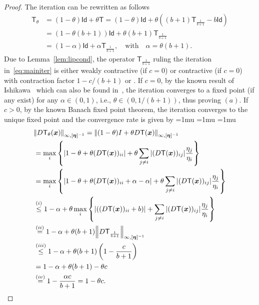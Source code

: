 \documentclass[journal,twoside,web]{ieeecolor}
\newcommand{\abs}[1]{{\left\vert #1 \right\vert}}
\newcommand{\norm}[1]{{\left\vert\kern-0.25ex\left\vert #1\right\vert\kern-0.25ex\right\vert}}
\newcommand{\xb}{\boldsymbol{x}}
\newcommand{\etab}{\boldsymbol{\eta}}
\newcommand{\Ts}{\mathsf{T}}
\newcommand{\Is}{\mathsf{Id}}
\begin{document}
\begin{proof}
    The iteration can be rewritten as follows
    $$
    \begin{aligned}
        \Ts_\theta &= (1-\theta)\Is+\theta \Ts = (1-\theta)\Is+\theta \left((b+1)\Ts_{\frac{1}{b+1}}-b\Is\right)\\
          & = (1-\theta(b+1))\Is+\theta (b+1)\Ts_{\frac{1}{b+1}}\\
          & = (1-\alpha)\Is + \alpha\Ts_{\frac{1}{b+1}},\quad \text{with} \quad \alpha =  \theta(b+1).
    \end{aligned}
    $$
    Due to Lemma~\ref{lem:lipcond}, the operator $\Ts_{\frac{1}{b+1}}$ ruling the iteration in~\eqref{eq:mainiter} is either weakly contractive (if $c=0$) or contractive (if $c=0$) with contraction factor $1-c/(b+1)$ or .
    If $c=0$, by the known result of Ishikawa~\cite{ishikawa76} which can also be found in~\cite[Lemma 11]{davydov2024non}, the iteration converges to a fixed point (if any exist) for any $\alpha\in(0,1)$, i.e., $\theta\in(0,1/(b+1))$, thus proving $(a)$.
    If $c>0$, by the known Banach fixed point theorem, the iteration converges to the unique fixed point and the convergence rate is given by 
    \begingroup
    \medmuskip=1mu
    \thinmuskip=1mu
    \thickmuskip=1mu
    \allowdisplaybreaks
    \begin{align*}
    & \norm{D\Ts_{\theta}(\xb)}_{\infty,[\etab]^{-1}} = \norm{(1-\theta) I + \theta D\Ts(\xb)}_{\infty,[\etab]^{-1}}\\
    & = \max_{i}\left\{\abs{1-\theta + \theta (D\Ts(\xb))_{ii}} + \theta \sum_{j\neq i} \abs{(D\Ts(\xb))_{ij}}\frac{\eta_j}{\eta_i}\right\}\\
    & = \max_{i}\left\{\abs{1-\theta+\theta(D\Ts(\xb))_{ii}+\alpha-\alpha} + \theta \sum_{j\neq i} \abs{(D\Ts(\xb))_{ij}}\frac{\eta_j}{\eta_i}\right\}\\
    & \overset{(i)}{\leq} 1-\alpha + \theta\max_{i}\left\{\abs{((D\Ts(\xb))_{ii}+b)} + \sum_{j\neq i} \abs{(D\Ts(\xb))_{ij}}\frac{\eta_j}{\eta_i}\right\}\\
    & \overset{(ii)}{=} 1-\alpha + \theta(b+1)\norm{D\Ts_{\frac{1}{b+1}}}_{\infty,[\etab]^{-1}}\\
    & \overset{(iii)}{\leq} 1-\alpha + \theta(b+1)  \left(1-\frac{c}{b+1}\right)\\
    & \overset{}{=} 1-\alpha + \theta(b+1)  -\theta c\\
    & \overset{(iv)}{=} 1-\frac{\alpha c}{b+1} = 1-\theta c.

\end{align*}
\end{proof}
\end{document}
